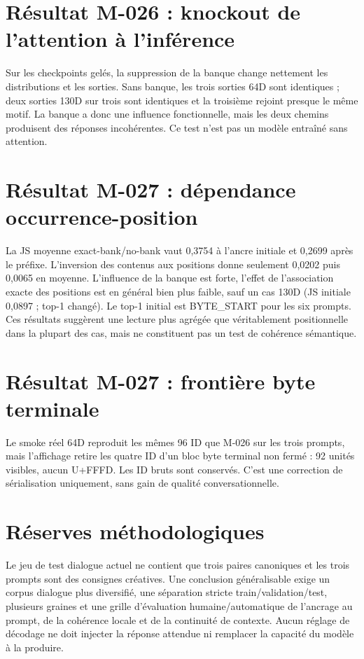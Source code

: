 \documentclass[11pt,a4paper]{report}
\begin{document}
\section{Résultat M-026 : knockout de l'attention à l'inférence}
Sur les checkpoints gelés, la suppression de la banque change nettement les distributions et les sorties. Sans banque, les trois sorties 64D sont identiques ; deux sorties 130D sur trois sont identiques et la troisième rejoint presque le même motif. La banque a donc une influence fonctionnelle, mais les deux chemins produisent des réponses incohérentes. Ce test n'est pas un modèle entraîné sans attention.

\section{Résultat M-027 : dépendance occurrence-position}
La JS moyenne exact-bank/no-bank vaut 0,3754 à l'ancre initiale et 0,2699 après le préfixe. L'inversion des contenus aux positions donne seulement 0,0202 puis 0,0065 en moyenne. L'influence de la banque est forte, l'effet de l'association exacte des positions est en général bien plus faible, sauf un cas 130D (JS initiale 0,0897 ; top-1 changé). Le top-1 initial est BYTE\_START pour les six prompts. Ces résultats suggèrent une lecture plus agrégée que véritablement positionnelle dans la plupart des cas, mais ne constituent pas un test de cohérence sémantique.

\section{Résultat M-027 : frontière byte terminale}
Le smoke réel 64D reproduit les mêmes 96 ID que M-026 sur les trois prompts, mais l'affichage retire les quatre ID d'un bloc byte terminal non fermé : 92 unités visibles, aucun U+FFFD. Les ID bruts sont conservés. C'est une correction de sérialisation uniquement, sans gain de qualité conversationnelle.

\section{Réserves méthodologiques}
Le jeu de test dialogue actuel ne contient que trois paires canoniques et les trois prompts sont des consignes créatives. Une conclusion généralisable exige un corpus dialogue plus diversifié, une séparation stricte train/validation/test, plusieurs graines et une grille d'évaluation humaine/automatique de l'ancrage au prompt, de la cohérence locale et de la continuité de contexte. Aucun réglage de décodage ne doit injecter la réponse attendue ni remplacer la capacité du modèle à la produire.
\end{document}

